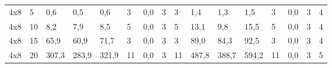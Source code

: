 \begin{table}[]
\begin{tabular}{llllllllllllllll}
		4x8     & 5      & 0,6                                                 & 0,5                                                 & 0,6                                                 & 3                                                   & 0,0                                                 & 3      & 3                                                         & 1,4                                                 & 1,3                                                 & 1,5                                                 & 3                                                   & 0,0                                                 & 3      & 4                                                         \\
		4x8     & 10     & 8,2                                                 & 7,9                                                 & 8,5                                                 & 5                                                   & 0,0                                                 & 3      & 5                                                         & 13,1                                                & 9,8                                                 & 15,5                                                & 5                                                   & 0,0                                                 & 3      & 4                                                         \\
		4x8     & 15     & 65,9                                                & 60,9                                                & 71,7                                                & 3                                                   & 0,0                                                 & 3      & 3                                                         & 89,0                                                & 84,3                                                & 92,5                                                & 3                                                   & 0,0                                                 & 3      & 4                                                         \\
		4x8     & 20     & 307,3                                               & 283,9                                               & 321,9                                               & 11                                                  & 0,0                                                 & 3      & 11                                                        & 487,8                                               & 388,7                                               & 594,2                                               & 11                                                  & 0,0                                                 & 3      & 5                                                         \\

\end{tabular}
\end{table}
